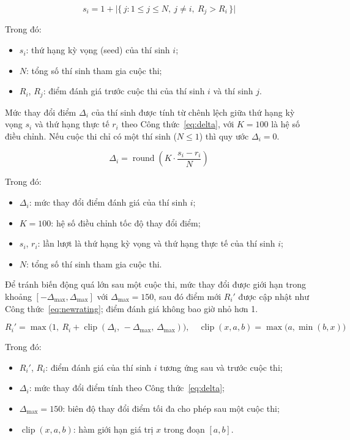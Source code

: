 \documentclass[12pt, a4paper]{report}
\begin{document}
\begin{equation}
  s_i = 1 + \bigl|\{\, j : 1 \le j \le N,\ j \ne i,\ R_j > R_i \,\}\bigr|
  \label{eq:seed}
\end{equation}

\noindent Trong đó:
\begin{itemize}
  \item $s_i$: thứ hạng kỳ vọng (seed) của thí sinh $i$;
  \item $N$: tổng số thí sinh tham gia cuộc thi;
  \item $R_i$, $R_j$: điểm đánh giá trước cuộc thi của thí sinh $i$ và thí sinh $j$.
\end{itemize}

Mức thay đổi điểm $\Delta_i$ của thí sinh được tính từ chênh lệch giữa thứ hạng kỳ vọng $s_i$
và thứ hạng thực tế $r_i$ theo Công thức~\eqref{eq:delta}, với $K = 100$ là hệ số điều chỉnh.
Nếu cuộc thi chỉ có một thí sinh ($N \le 1$) thì quy ước $\Delta_i = 0$.

\begin{equation}
  \Delta_i = \operatorname{round}\!\left( K \cdot \frac{s_i - r_i}{N} \right)
  \label{eq:delta}
\end{equation}

\noindent Trong đó:
\begin{itemize}
  \item $\Delta_i$: mức thay đổi điểm đánh giá của thí sinh $i$;
  \item $K = 100$: hệ số điều chỉnh tốc độ thay đổi điểm;
  \item $s_i$, $r_i$: lần lượt là thứ hạng kỳ vọng và thứ hạng thực tế của thí sinh $i$;
  \item $N$: tổng số thí sinh tham gia cuộc thi.
\end{itemize}

Để tránh biến động quá lớn sau một cuộc thi, mức thay đổi được giới hạn trong khoảng
$[-\Delta_{\max}, \Delta_{\max}]$ với $\Delta_{\max} = 150$, sau đó điểm mới $R_i'$ được cập
nhật như Công thức~\eqref{eq:newrating}; điểm đánh giá không bao giờ nhỏ hơn 1.

\begin{equation}
  R_i' = \max\!\bigl(1,\ R_i + \operatorname{clip}(\Delta_i,\,-\Delta_{\max},\,\Delta_{\max})\bigr),
  \quad \operatorname{clip}(x, a, b) = \max\!\bigl(a, \min(b, x)\bigr)
  \label{eq:newrating}
\end{equation}

\noindent Trong đó:
\begin{itemize}
  \item $R_i'$, $R_i$: điểm đánh giá của thí sinh $i$ tương ứng sau và trước cuộc thi;
  \item $\Delta_i$: mức thay đổi điểm tính theo Công thức~\eqref{eq:delta};
  \item $\Delta_{\max} = 150$: biên độ thay đổi điểm tối đa cho phép sau một cuộc thi;
  \item $\operatorname{clip}(x, a, b)$: hàm giới hạn giá trị $x$ trong đoạn $[a, b]$.
\end{itemize}
\end{document}
